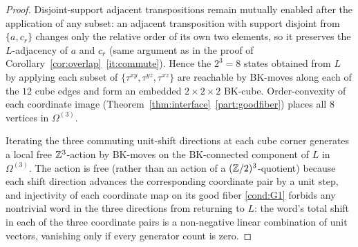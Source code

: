 \begin{proof}
Disjoint-support adjacent transpositions remain mutually enabled after the
application of any subset: an adjacent transposition with support disjoint
from $\{a,c_r\}$ changes only the relative order of its own two elements,
so it preserves the $L$-adjacency of $a$ and $c_r$ (same argument as in
the proof of Corollary~\ref{cor:overlap}~\ref{it:commute}). Hence the
$2^3=8$ states obtained from $L$ by applying each subset of
$\{\tau^{xy},\tau^{yz},\tau^{xz}\}$ are reachable by BK-moves along each
of the $12$ cube edges and form an embedded $2\times 2\times 2$ BK-cube.
Order-convexity of each coordinate image
(Theorem~\ref{thm:interface}~\ref{part:goodfiber}) places all $8$ vertices
in $\Omega^{(3)}$.

Iterating the three commuting unit-shift directions at each cube corner
generates a local free $\mathbb{Z}^3$-action by BK-moves on the BK-connected
component of $L$ in $\Omega^{(3)}$. The action is free (rather than an
action of a $(\mathbb{Z}/2)^3$-quotient) because each shift direction advances the
corresponding coordinate pair by a unit step, and injectivity of each
coordinate map on its good fiber \ref{cond:G1} forbids any nontrivial
word in the three directions from returning to $L$: the word's total shift
in each of the three coordinate pairs is a non-negative linear combination
of unit vectors, vanishing only if every generator count is zero.


\end{proof}
